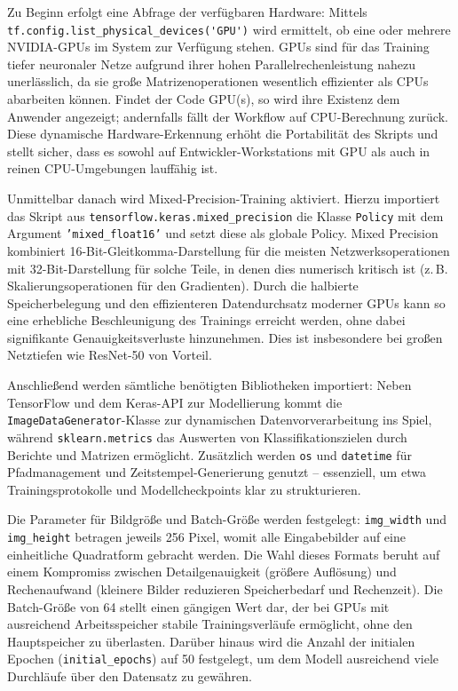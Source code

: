 Zu Beginn erfolgt eine Abfrage der verfügbaren Hardware: Mittels \nolinkurl{tf.config.list_physical_devices('GPU')} wird ermittelt, ob eine oder mehrere NVIDIA-GPUs im System zur Verfügung stehen. GPUs sind für das Training tiefer neuronaler Netze aufgrund ihrer hohen Parallelrechenleistung nahezu unerlässlich, da sie große Matrizenoperationen wesentlich effizienter als CPUs abarbeiten können. Findet der Code GPU(s), so wird ihre Existenz dem Anwender angezeigt; andernfalls fällt der Workflow auf CPU-Berechnung zurück. Diese dynamische Hardware-Erkennung erhöht die Portabilität des Skripts und stellt sicher, dass es sowohl auf Entwickler-Workstations mit GPU als auch in reinen CPU-Umgebungen lauffähig ist.

Unmittelbar danach wird Mixed-Precision-Training aktiviert. Hierzu importiert das Skript aus \texttt{tensorflow.keras.mixed\_precision} die Klasse \texttt{Policy} mit dem Argument \texttt{'mixed\_float16'} und setzt diese als globale Policy. Mixed Precision kombiniert 16-Bit-Gleitkomma-Darstellung für die meisten Netzwerksoperationen mit 32-Bit-Darstellung für solche Teile, in denen dies numerisch kritisch ist (z.\,B. Skalierungsoperationen für den Gradienten). Durch die halbierte Speicherbelegung und den effizienteren Datendurchsatz moderner GPUs kann so eine erhebliche Beschleunigung des Trainings erreicht werden, ohne dabei signifikante Genauigkeitsverluste hinzunehmen. Dies ist insbesondere bei großen Netztiefen wie ResNet-50 von Vorteil.

Anschließend werden sämtliche benötigten Bibliotheken importiert: Neben TensorFlow und dem Keras-API zur Modellierung kommt die \texttt{ImageDataGenerator}-Klasse zur dynamischen Datenvorverarbeitung ins Spiel, während \texttt{sklearn.metrics} das Auswerten von Klassifikationszielen durch Berichte und Matrizen ermöglicht. Zusätzlich werden \texttt{os} und \texttt{datetime} für Pfadmanagement und Zeitstempel-Generierung genutzt – essenziell, um etwa Trainingsprotokolle und Modellcheckpoints klar zu strukturieren.

Die Parameter für Bildgröße und Batch-Größe werden festgelegt: \texttt{img\_width} und \texttt{img\_height} betragen jeweils 256 Pixel, womit alle Eingabebilder auf eine einheitliche Quadratform gebracht werden. Die Wahl dieses Formats beruht auf einem Kompromiss zwischen Detailgenauigkeit (größere Auflösung) und Rechenaufwand (kleinere Bilder reduzieren Speicherbedarf und Rechenzeit). Die Batch-Größe von 64 stellt einen gängigen Wert dar, der bei GPUs mit ausreichend Arbeitsspeicher stabile Trainingsverläufe ermöglicht, ohne den Hauptspeicher zu überlasten. Darüber hinaus wird die Anzahl der initialen Epochen (\texttt{initial\_epochs}) auf 50 festgelegt, um dem Modell ausreichend viele Durchläufe über den Datensatz zu gewähren.

